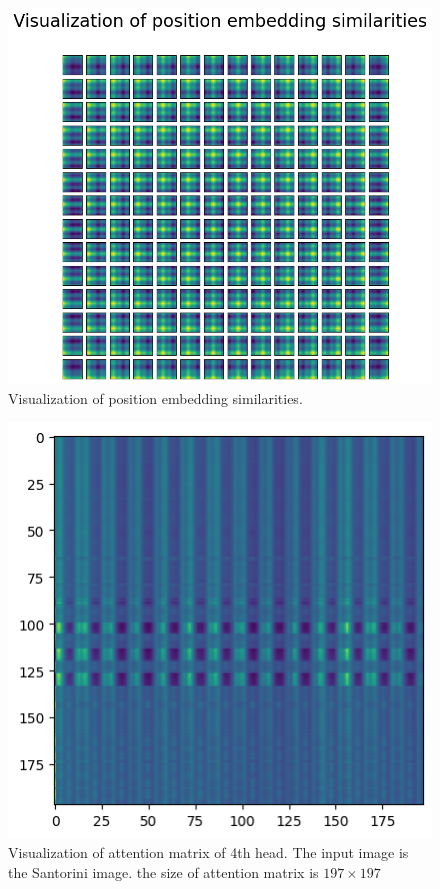 \documentclass[extendedabs]{bmvc2k}
\begin{document}
\begin{figure}[t]
\centering
	\includegraphics[width=\linewidth]{images/fig5.png}
	\caption{
		Visualization of position embedding similarities.}
	\vspace{-2mm}
        \label{posembedsimilar}
\end{figure}

\begin{figure}[t]
\centering
	\includegraphics[width=0.7\linewidth]{images/fig6.png}
	\caption{
		Visualization of attention matrix of 4th head. The input image is the Santorini image. the size of attention matrix is $197\times197$}
	\vspace{-2mm}
        \label{fig:attentionvis1}
\end{figure}
\end{document}
